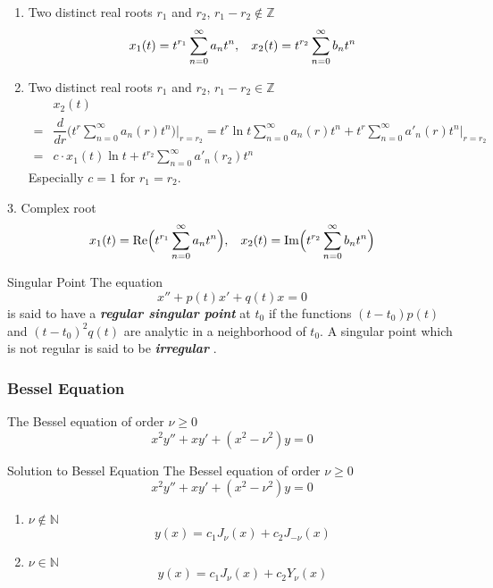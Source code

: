 \documentclass{beamer}
\begin{document}
\begin{frame}
\begin{enumerate}
\item Two distinct real roots $r_1$ and $r_2$, $r_1-r_2\notin\mathbb{Z}$
$$x_1(t)=t^{r_1}\sum\limits_{n=0}^{\infty}a_nt^n,\hspace{3mm}x_2(t)=t^{r_2}\sum\limits_{n=0}^{\infty}b_nt^n$$
\item Two distinct real roots $r_1$ and $r_2$, $r_1-r_2\in\mathbb{Z}$
\begin{align*}
&x_2(t)\\
=&\dfrac{d}{d r}\Big(t^r\sum\limits_{n=0}^{\infty}a_n(r)t^n\Big)\Bigg|_{r=r_2}=t^{r}\ln t\sum\limits_{n=0}^{\infty}a_n(r)t^n+t^{r}\sum\limits_{n=0}^{\infty}a'_n(r)t^n\Bigg|_{r=r_2}\\
=&c\cdot x_1(t)\ln t+t^{r_2}\sum\limits_{n=0}^{\infty}a'_n(r_2)t^n
\end{align*}
Especially $c=1$ for $r_1=r_2$.
\end{enumerate}
\end{frame}
\begin{frame}
\begin{block}{3. Complex root}
$$x_1(t)=\text{Re}\Big(t^{r_1}\sum\limits_{n=0}^{\infty}a_nt^n\Big),\hspace{3mm}x_2(t)=\text{Im}\Big(t^{r_2}\sum\limits_{n=0}^{\infty}b_nt^n\Big)$$

\end{block}
\end{frame}

\begin{frame}
\begin{block}{Singular Point}
The equation
$$x''+ p(t)x'+ q(t)x = 0$$
is said to have a \textcolor[rgb]{0,0.6,0.3}{\textbf{\textit{regular singular point}}} at $t_0$ if the functions $(t - t_0)p(t)$ and $(t - t_0)^2q(t)$ are analytic in a neighborhood of $t_0$. A singular point which is not regular is said to be \textcolor[rgb]{0,0.6,0.3}{\textbf{\textit{irregular}}} .
\end{block}
\end{frame}

\begin{frame}
\frametitle{Bessel Equation}
The Bessel equation of order $ \nu\geqslant0$
$$x^2y''+xy'+(x^2-\nu^2)y=0$$

\end{frame}


\begin{frame}
\begin{block}{Solution to Bessel Equation}
The Bessel equation of order $ \nu\geqslant0$
$$x^2y''+xy'+(x^2-\nu^2)y=0$$
\begin{enumerate}
\item $\nu\notin\mathbb{N}$
$$y(x)=c_1J_{\nu}(x)+c_2J_{-\nu}(x)$$
\item $\nu\in\mathbb{N}$
$$y(x)=c_1J_{\nu}(x)+c_2Y_{\nu}(x)$$
\end{enumerate}
\end{block}
\end{frame}
\end{document}
